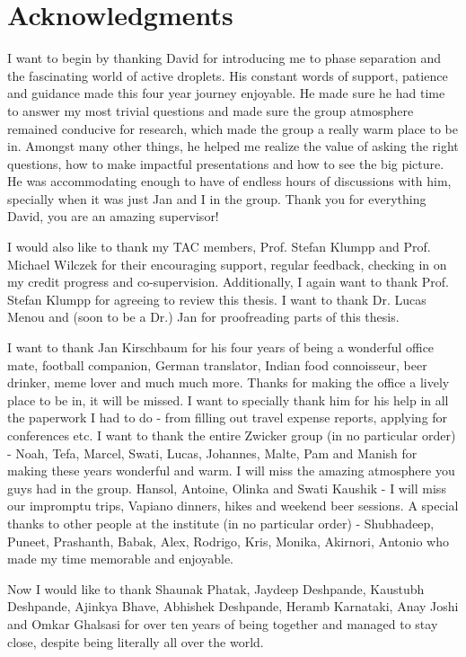\chapter*{Acknowledgments}


I want to begin by thanking David for introducing me to phase separation and the fascinating world of active droplets.
His constant words of support, patience and guidance made this four year journey enjoyable. 
He made sure he had time to answer my most trivial questions and made sure the group atmosphere remained conducive for research, which made the group a really warm place to be in.
Amongst many other things, he helped me realize the value of asking the right questions, how to make impactful presentations and how to see the big picture.
He was accommodating enough to have of endless hours of discussions with him, specially when it was just Jan and I in the group.
Thank you for everything David, you are an amazing supervisor!

I would also like to thank my TAC members, Prof. Stefan Klumpp and Prof. Michael Wilczek for their encouraging support, regular feedback, checking in on my credit progress and co-supervision.
Additionally, I again want to thank Prof. Stefan Klumpp for agreeing to review this thesis.
I want to thank Dr. Lucas Menou and (soon to be a Dr.) Jan for proofreading parts of this thesis. 

I want to thank Jan Kirschbaum for his four years of being a wonderful office mate, football companion, German translator, Indian food connoisseur, beer drinker, meme lover and much much more.
Thanks for making the office a lively place to be in, it will be missed. 
I want to specially thank him for his help in all the paperwork I had to do - from filling out travel expense reports, applying for conferences etc.
I want to thank the entire Zwicker group (in no particular order) - Noah, Tefa, Marcel, Swati, Lucas, Johannes, Malte, Pam and Manish for making these years wonderful and warm.
I will miss the amazing atmosphere you guys had in the group.
Hansol, Antoine, Olinka and Swati Kaushik - I will miss our impromptu trips, Vapiano dinners, hikes and weekend beer sessions.
A special thanks to other people at the institute (in no particular order) - Shubhadeep, Puneet, Prashanth, Babak, Alex, Rodrigo, Kris, Monika, Akirnori, Antonio who made my time memorable and enjoyable.

Now I would like to thank Shaunak Phatak, Jaydeep Deshpande, Kaustubh Deshpande, Ajinkya Bhave, Abhishek Deshpande, Heramb Karnataki, Anay Joshi and Omkar Ghalsasi for over ten years of being together and managed to stay close, despite being literally all over the world.

